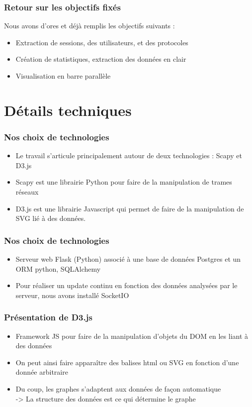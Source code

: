 \documentclass{beamer}
\begin{document}
  \begin{frame}
  \frametitle{Retour sur les objectifs fixés}
    Nous avons d'ores et déjà remplis les objectifs suivants :
    \begin{itemize}
     \item Extraction de sessions, des utilisateurs, et des protocoles
     \item Création de statistiques, extraction des données en clair
     \item Visualisation en barre parallèle
    \end{itemize}
  \end{frame}
  
  \section{Détails techniques}
  \begin{frame}
  \frametitle{Nos choix de technologies}
   \begin{itemize}
    \item Le travail s'articule principalement autour de deux technologies :
    Scapy et D3.js
    \item Scapy est une librairie Python pour faire de la manipulation de trames
    réseaux
    \item D3.js est une librairie Javascript qui permet de faire de la
    manipulation de SVG lié à des données.
   \end{itemize}
  \end{frame}
  
  \begin{frame}
  \frametitle{Nos choix de technologies}
   \begin{itemize}
    \item Serveur web Flask (Python) associé à une base de données Postgres et
    un ORM python, SQLAlchemy
    \item Pour réaliser un update continu en fonction des données analysées par
    le serveur, nous avons installé SocketIO
   \end{itemize}
  \end{frame}
  
  \begin{frame}
  \frametitle{Présentation de D3.js}
   \begin{itemize}
    \item Framework JS pour faire de la manipulation d'objets du DOM en les
    liant à des données
    \item On peut ainsi faire apparaître des balises html ou SVG en fonction
    d'une donnée arbitraire
    \item Du coup, les graphes s'adaptent aux données de façon automatique
    \\-\textgreater \hspace{0.3mm} La structure des données est ce qui détermine
    le graphe
   \end{itemize}
  \end{frame}
  
\end{document}
